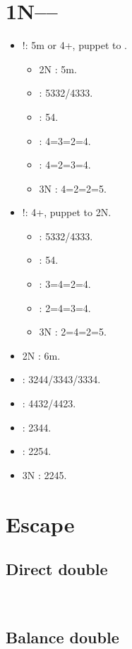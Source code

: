 \documentclass[12pt,twoside,a5paper]{report}%
\begin{document}
	\section*{1N----}
		\begin{itemize}
		\renewcommand{\labelitemi}{}
		\item {}!: 5m or 4+\sp{}, puppet to .
			\begin{itemize}
			\renewcommand{\labelitemi}{--}
			\item 2N : 5m.
			\item {} : 5\sp{}332/4\sp{}333.
			\item {} : 5\sp{}4\di{}.
			\item {} : 4=3=2=4.
			\item {} : 4=2=3=4.
			\item 3N : 4=2=2=5.
			\end{itemize}
		
		\item {}!: 4+\he{}, puppet to 2N.
			\begin{itemize}
			\renewcommand{\labelitemi}{--}
			\item {} : 5\he{}332/4\he{}333.
			\item {} : 5\he{}4\di{}.
			\item {} : 3=4=2=4.
			\item {} : 2=4=3=4.
			\item 3N : 2=4=2=5.			
			\end{itemize}
		\item 2N : 6m.
		\item {} : 3244/3343/3334.
		\item {} : 4432/4423.
		\item {} : 2344.
		\item {} : 2254.
		\item 3N : 2245.
		\end{itemize}
	\section*{Escape}
		\subsection*{Direct double}
		\\

		\subsection*{Balance double}
		\\
\end{document}
